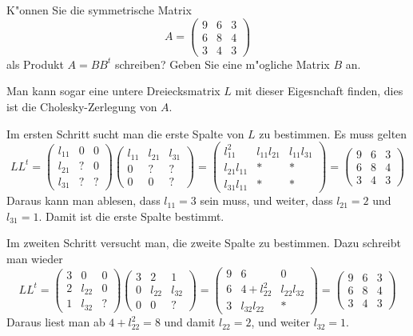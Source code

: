 K"onnen Sie die symmetrische Matrix
\[
A=\begin{pmatrix}
9&6&3\\
6&8&4\\
3&4&3
\end{pmatrix}
\]
als Produkt $A=BB^t$ schreiben? Geben Sie eine m"ogliche Matrix $B$ an.

\begin{loesung}
Man kann sogar eine untere Dreiecksmatrix $L$ mit dieser Eigesnchaft finden,
dies ist die Cholesky-Zerlegung von $A$.

Im ersten Schritt sucht man die erste Spalte von $L$ zu bestimmen.
Es muss gelten
\[
LL^t=
\begin{pmatrix}
l_{11}&  0&  0\\
l_{21}&  ?&  0\\
l_{31}&  ?&  ?
\end{pmatrix}
\begin{pmatrix}
l_{11}&l_{21}&l_{31}\\
     0&     ?&     ?\\
     0&     0&     ?
\end{pmatrix}
=
\begin{pmatrix}
    l_{11}^2&l_{11}l_{21}&l_{11}l_{31}\\
l_{21}l_{11}&           *&           *\\
l_{31}l_{11}&           *&           *
\end{pmatrix}
=
\begin{pmatrix}
9&6&3\\
6&8&4\\
3&4&3
\end{pmatrix}
\]
Daraus kann man ablesen, dass $l_{11}=3$ sein muss, und weiter,
dass
$l_{21}=2$ und $l_{31}=1$. Damit ist die erste Spalte bestimmt.

Im zweiten Schritt versucht man, die zweite Spalte zu bestimmen.
Dazu schreibt man wieder
\[
LL^t
=
\begin{pmatrix}
3&     0&0\\
2&l_{22}&0\\
1&l_{32}&?
\end{pmatrix}
\begin{pmatrix}
3&     2&     1\\
0&l_{22}&l_{32}\\
0&     0&?
\end{pmatrix}
=
\begin{pmatrix}
9&6           &           0\\
6&4+l_{22}^2  &l_{22}l_{32}\\
3&l_{32}l_{22}&         *
\end{pmatrix}
=
\begin{pmatrix}
9&6&3\\
6&8&4\\
3&4&3
\end{pmatrix}
\]
Daraus liest man ab $4+l_{22}^2=8$ und damit $l_{22}=2$, und weiter
$l_{32}=1$.


\end{loesung}
